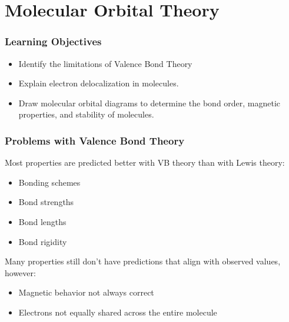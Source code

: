 \documentclass[notes=only]{beamer}
\begin{document}

\section{Molecular Orbital Theory}

\begin{frame}
	\frametitle{Learning Objectives}
	\begin{itemize}
	\item Identify the limitations of Valence Bond Theory
	\item Explain electron delocalization in molecules.
	\item Draw molecular orbital diagrams to determine the bond order,
		magnetic properties, and stability of molecules.
	\end{itemize}
\end{frame}

\clearpage

\begin{frame}[t]
	\frametitle{Problems with Valence Bond Theory}
	Most properties are predicted better with VB theory than with Lewis
	theory:
	\begin{itemize}[<1->]
		\item Bonding schemes
		\item Bond strengths
		\item Bond lengths
		\item Bond rigidity
	\end{itemize}

	\pause

	Many properties still don't have predictions that align with observed
	values, however:
	\begin{itemize}[<1->]
		\item Magnetic behavior not always correct
		\item Electrons not equally shared across the
			entire molecule
	\end{itemize}
\end{frame}
\end{document}
